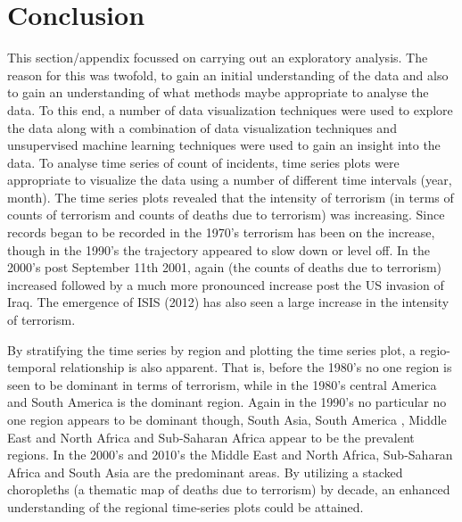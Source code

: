 \section{Conclusion}
This section/appendix focussed on carrying out an exploratory analysis. The reason for this was twofold, to gain an initial understanding of the data and also to gain an understanding of what methods maybe appropriate to analyse the data. To this end, a number of data visualization techniques were used to explore the data along with a combination of data visualization techniques and unsupervised machine learning techniques were used to gain an insight into the data. To analyse time series of count of incidents, time series plots were appropriate to visualize the data using a number of different time intervals (year, month). The time series plots revealed that the intensity of terrorism (in terms of counts of terrorism and counts of deaths due to terrorism) was increasing. Since records began to be recorded in the 1970’s terrorism has been on the increase, though in the 1990’s the trajectory appeared to slow down or level off. In the 2000’s post September 11th 2001, again (the counts of deaths due to terrorism) increased followed by a much more pronounced increase post the US invasion of Iraq. The emergence of ISIS (2012) has also seen a large increase in the intensity of terrorism. 

By stratifying the time series by region and plotting the time series plot, a regio-temporal relationship is also apparent. That is, before the 1980’s no one region is seen to be dominant in terms of terrorism, while in the 1980’s central America and South America is the dominant region. Again in the 1990’s no particular no one region appears to be dominant though, South Asia, South America , Middle East and North Africa and Sub-Saharan Africa appear to be the prevalent regions. In the 2000’s and 2010’s  the Middle East and North Africa, Sub-Saharan Africa and South Asia are the predominant areas.  By utilizing a stacked choropleths (a thematic map of deaths due to terrorism) by decade, an enhanced understanding of the regional time-series plots could be attained. 

